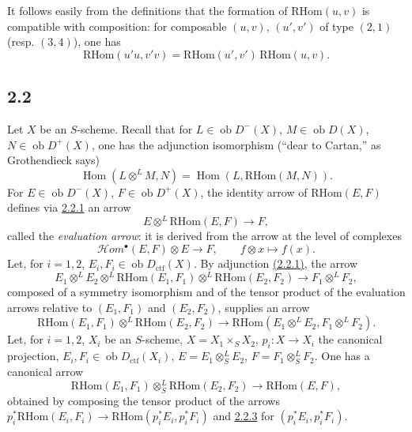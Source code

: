 \documentclass[11pt]{article}
\DeclareMathOperator{\Hom}{Hom}
\newcommand{\ob}{\operatorname{ob}}
\providecommand{\RHom}{\mathrm{RHom}}
\providecommand{\ctf}{\mathrm{ctf}}
\providecommand{\RHom}{\mathrm{RHom}}
\providecommand{\Hom}{\operatorname{Hom}}
\providecommand{\ob}{\operatorname{ob}}
\providecommand{\RHom}{\mathrm R\mathcal{H}om}
\providecommand{\RHom}{\mathrm{RHom}}
\providecommand{\Hom}{\operatorname{Hom}}
\begin{document}
It follows easily from the definitions that the formation of $\RHom(u,v)$ is compatible with composition: for composable $(u,v)$, $(u',v')$ of type $(2,1)$ (resp. $(3,4)$), one has
\begin{equation}\tag{2.1.6}\label{sga5:III:equation:2.1.6}
\RHom(u'u,v'v)=\RHom(u',v')\,\RHom(u,v).
\end{equation}

\subsection*{2.2}\label{sga5:III:subsection:2.2}
Let $X$ be an $S$-scheme. Recall that for $L\in\ob D^{-}(X)$, $M\in\ob D(X)$, $N\in\ob D^{+}(X)$, one has the adjunction isomorphism (``dear to Cartan,'' as Grothendieck says)
\begin{equation}\tag{2.2.1}\label{sga5:III:equation:2.2.1}
\Hom(L\otimes^{L}M,N)=\Hom(L,\RHom(M,N)).
\end{equation}
For $E\in\ob D^{-}(X)$, $F\in\ob D^{+}(X)$, the identity arrow of $\RHom(E,F)$ defines via \hyperref[sga5:III:equation:2.2.1]{2.2.1} an arrow
\begin{equation}\tag{2.2.2}\label{sga5:III:equation:2.2.2}
E\otimes^{L}\RHom(E,F)\longrightarrow F,
\end{equation}
called the \emph{evaluation arrow}: it is derived from the arrow at the level of complexes
\[
\mathcal Hom^{\bullet}(E,F)\otimes E\longrightarrow F,
\qquad f\otimes x\longmapsto f(x).
\]
Let, for $i=1,2$, $E_i,F_i\in\ob D_{\ctf}(X)$. By adjunction \hyperref[sga5:III:equation:2.2.1]{(2.2.1)}, the arrow
\[
E_1\otimes^{L}E_2\otimes^{L}\RHom(E_1,F_1)\otimes^{L}\RHom(E_2,F_2)\longrightarrow F_1\otimes^{L}F_2,
\]
composed of a symmetry isomorphism and of the tensor product of the evaluation arrows relative to $(E_1,F_1)$ and $(E_2,F_2)$, supplies an arrow
\begin{equation}\tag{2.2.3}\label{sga5:III:equation:2.2.3}
\RHom(E_1,F_1)\otimes^{L}\RHom(E_2,F_2)\longrightarrow\RHom(E_1\otimes^{L}E_2,F_1\otimes^{L}F_2).
\end{equation}
Let, for $i=1,2$, $X_i$ be an $S$-scheme, $X=X_1\times_SX_2$, $p_i:X\to X_i$ the canonical projection, $E_i,F_i\in\ob D_{\ctf}(X_i)$, $E=E_1\otimes^{L}_{S}E_2$, $F=F_1\otimes^{L}_{S}F_2$. One has a canonical arrow
\begin{equation}\tag{2.2.4}\label{sga5:III:equation:2.2.4}
\RHom(E_1,F_1)\otimes^{L}_{S}\RHom(E_2,F_2)\longrightarrow\RHom(E,F),
\end{equation}
obtained by composing the tensor product of the arrows $p_i^{*}\RHom(E_i,F_i)\to\RHom(p_i^{*}E_i,p_i^{*}F_i)$ and \hyperref[sga5:III:equation:2.2.3]{2.2.3} for $(p_i^{*}E_i,p_i^{*}F_i)$.
\end{document}
